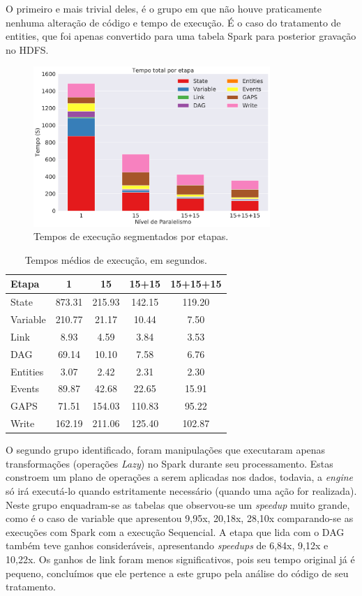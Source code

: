 O primeiro e mais trivial deles, é o grupo em que não houve praticamente 
nenhuma alteração de código e tempo de execução. É o caso do tratamento de 
entities, que foi apenas convertido para uma tabela Spark para posterior 
gravação no HDFS.

\begin{figure}[H]
\centerline{
\includegraphics[width=0.8\textwidth]{./img/total_step.pdf}}
 \caption{Tempos de execução segmentados por etapas.}
 \label{fig:total_step}
\end{figure}


\begin{table}[ht]
\centering
\small
\begin{tabular}{l c c c c} \toprule
\textbf{Etapa}  & \textbf{1} & \textbf{15} & \textbf{15+15} & 
\textbf{15+15+15}\\ 
\midrule
State		& 873.31 & 215.93 & 142.15 & 119.20\\
Variable  	& 210.77 & 21.17  & 10.44  & 7.50 \\
Link      	& 8.93   & 4.59   & 3.84   & 3.53 \\
DAG        	& 69.14  & 10.10  & 7.58   & 6.76 \\
Entities	& 3.07   & 2.42   & 2.31   & 2.30 \\
Events		& 89.87  & 42.68  & 22.65  & 15.91\\
GAPS		& 71.51  & 154.03 & 110.83 & 95.22\\
Write		& 162.19 & 211.06 & 125.40 & 102.87\\
\end{tabular}
\caption{Tempos médios de execução, em segundos.}
\label{tab:total_step}
\end{table}

O segundo grupo identificado, foram manipulações que executaram apenas 
transformações (operações \textit{Lazy}) no Spark \cite{ref:sparkbook} durante 
seu processamento. Estas constroem um plano de operações a serem aplicadas nos 
dados, todavia, a \textit{engine} só irá executá-lo quando estritamente 
necessário (quando uma ação for realizada). Neste grupo enquadram-se as tabelas 
que observou-se um \textit{speedup} muito grande, como é o caso de variable que 
apresentou 9,95x, 20,18x, 28,10x comparando-se as execuções com Spark com a 
execução Sequencial. A etapa que lida com o DAG também teve ganhos 
consideráveis, apresentando \textit{speedups} de 6,84x, 9,12x e 10,22x. Os 
ganhos de link foram menos significativos, pois seu tempo original já é 
pequeno, concluímos que ele pertence a este grupo pela análise do código de seu 
tratamento.

